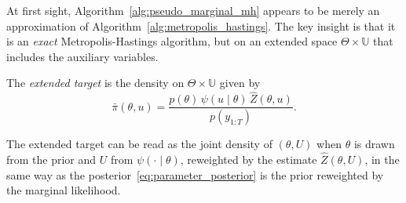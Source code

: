 At first sight, Algorithm~\ref{alg:pseudo_marginal_mh} appears to be merely an approximation of Algorithm~\ref{alg:metropolis_hastings}. The key insight is that it is an \emph{exact} Metropolis-Hastings algorithm, but on an extended space $\Theta\times\mathbb{U}$ that includes the auxiliary variables.

\begin{definition}
    \label{def:extended_target}
    The \emph{extended target} is the density on $\Theta\times\mathbb{U}$ given by
    \begin{equation}
        \bar{\pi}(\theta,u) = \frac{p(\theta)\,\psi(u\mid\theta)\,\hat{Z}(\theta,u)}{p(y_{1:T})}.
        \label{eq:extended_target}
    \end{equation}
\end{definition}

The extended target can be read as the joint density of $(\theta,U)$ when $\theta$ is drawn from the prior and $U$ from $\psi(\cdot\mid\theta)$, reweighted by the estimate $\hat{Z}(\theta,U)$, in the same way as the posterior~\eqref{eq:parameter_posterior} is the prior reweighted by the marginal likelihood.

